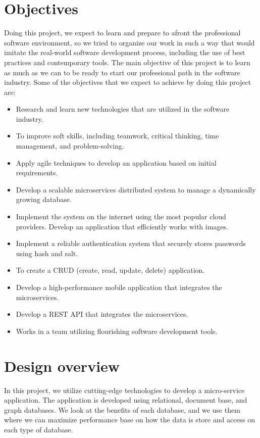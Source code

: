 \section{Objectives}
\vskip 0.1in
\indent
\indent
Doing this project, we expect to learn and prepare to afront the professional software environment, so we tried to organize our work in such a way that would imitate the real-world software development process, including the use of best practices and contemporary tools.
 The main objective of this project is to learn as much as we can to be ready to start our professional path in the software industry.
  Some of the objectives that we expect to achieve by doing this project are:
\begin{itemize}
	\item Research and learn new technologies that are utilized in the software industry.
	
	\item To improve soft skills, including teamwork, critical thinking, time management, and problem-solving.
	
	\item Apply agile techniques to develop an application based on initial requirements.
	
   	\item 	Develop a scalable microservices distributed system to manage a dynamically growing database. 
	
	\item Implement the system on the internet using the most popular cloud providers.
	Develop an application that efficiently works with images.
	
	\item Implement a reliable authentication system that securely stores passwords using hash and salt.
	
	\item To create a CRUD (create, read, update, delete) application.
	
	\item Develop a high-performance mobile application that integrates the microservices.
	
	\item Develop a REST API that integrates the microservices.
	
	\item Works in a team utilizing flourishing software development tools.
\end{itemize}


\section{Design overview}
\indent
\indent
In this project, we utilize cutting-edge technologies to develop a micro-service application.   The application is developed using relational, document base, and graph databases. We look at the benefits of each database, and we use them where we can maximize performance base on how the data is store and access on each type of database.

